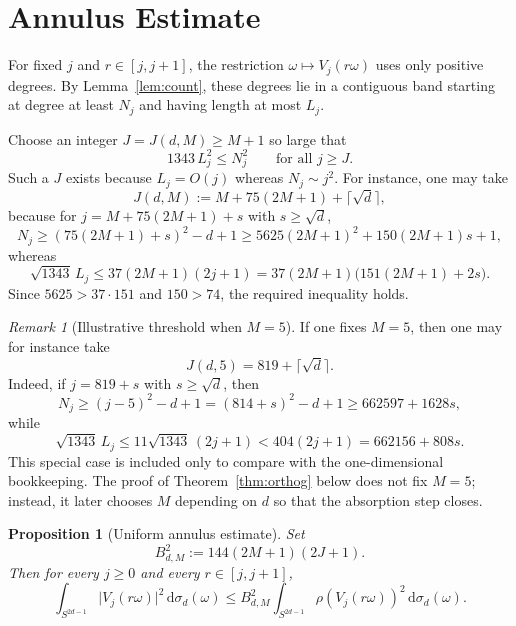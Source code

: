 \documentclass[11pt]{amsart}
\newtheorem{proposition}[theorem]{Proposition}
\theoremstyle{remark}
\newtheorem{remark}[theorem]{Remark}
\newcommand{\abs}[1]{\lvert #1 \rvert}
\newcommand{\dd}{\mathrm{d}}
\newcommand{\rhoFn}{\rho}
\newcommand{\Sphere}{S^{2d-1}}
\begin{document}
\section{Annulus Estimate}

For fixed $j$ and $r \in [j,j+1]$, the restriction
$\omega \mapsto V_j(r\omega)$ uses only positive degrees.  By
Lemma~\ref{lem:count}, these degrees lie in a contiguous band starting at
degree at least $N_j$ and having length at most $L_j$.

Choose an integer $J = J(d,M) \ge M+1$ so large that
\begin{equation}\label{eq:threshold}
1343\, L_j^2 \le N_j^2
\qquad
\text{for all } j \ge J.
\end{equation}
Such a $J$ exists because $L_j = O(j)$ whereas $N_j \sim j^2$.
For instance, one may take
\[
J(d,M) := M + 75(2M+1) + \lceil \sqrt d \rceil,
\]
because for $j = M + 75(2M+1) + s$ with $s \ge \sqrt d$,
\[
N_j \ge (75(2M+1)+s)^2 - d + 1
\ge 5625(2M+1)^2 + 150(2M+1)s + 1,
\]
whereas
\[
\sqrt{1343}\,L_j
\le
37(2M+1)(2j+1)
=
37(2M+1)\bigl(151(2M+1)+2s\bigr).
\]
Since $5625 > 37 \cdot 151$ and $150 > 74$, the required inequality holds.

\begin{remark}[Illustrative threshold when $M=5$]\label{rem:explicit-J}
If one fixes $M=5$, then one may for instance take
\[
J(d,5) = 819 + \lceil \sqrt d \rceil.
\]
Indeed, if $j = 819+s$ with $s \ge \sqrt d$, then
\[
N_j \ge (j-5)^2 - d + 1 = (814+s)^2 - d + 1 \ge 662597 + 1628s,
\]
while
\[
\sqrt{1343}\,L_j
\le
11\sqrt{1343}\,(2j+1)
<
404(2j+1)
=
662156 + 808s.
\]
This special case is included only to compare with the one-dimensional
bookkeeping.  The proof of Theorem~\ref{thm:orthog} below does not fix
$M=5$; instead, it later chooses $M$ depending on $d$ so that the absorption
step closes.
\end{remark}

\begin{proposition}[Uniform annulus estimate]\label{prop:annulus}
Set
\[
B_{d,M}^2 := 144(2M+1)(2J+1).
\]
Then for every $j \ge 0$ and every $r \in [j,j+1]$,
\[
\int_{\Sphere} \abs{V_j(r\omega)}^2\,\dd \sigma_d(\omega)
\le
B_{d,M}^2
\int_{\Sphere} \rhoFn(V_j(r\omega))^2\,\dd \sigma_d(\omega).
\]
\end{proposition}
\end{document}
